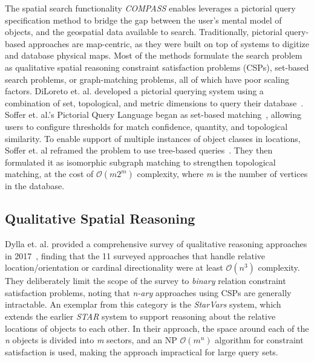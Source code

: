 \par{The spatial search functionality \emph{COMPASS} enables leverages a pictorial query specification method to bridge the gap between the user's mental model of objects, and the geospatial data available to search. 
Traditionally, pictorial query-based approaches are map-centric, as they were built on top of systems to digitize and database physical maps\cite{Samet1996,Samet1998}.
Most of the methods formulate the search problem as qualitative spatial reasoning constraint satisfaction problems (CSPs), set-based search problems, or graph-matching problems, all of which have poor scaling factors.
DiLoreto et. al. developed a pictorial querying system using a combination of set, topological, and metric dimensions to query their database~\cite{DiLoreto1996}.
Soffer et. al.'s Pictorial Query Language began as set-based matching~\cite{Soffer1997, Soffer1998a}, allowing users to configure thresholds for match confidence, quantity, and topological similarity.
To enable support of multiple instances of object classes in locations, Soffer et. al reframed the problem to use tree-based queries~\cite{Soffer1999}.
They then formulated it as isomorphic subgraph matching to strengthen topological matching, at the cost of $\mathcal{O}(m2^m)$ complexity, where \textit{m} is the number of vertices in the database. 



}


\subsection{Qualitative Spatial Reasoning}
\par{Dylla et. al. provided a comprehensive survey of qualitative reasoning approaches in 2017~\cite{Dylla2017}, finding that the 11 surveyed approaches that handle relative location/orientation or cardinal directionality were at least $\mathcal{O}(n^3)$ complexity. 
They deliberately limit the scope of the survey to \textit{binary} relation constraint satisfaction problems, noting that \textit{n-ary} approaches using CSPs are generally intractable.
An exemplar from this category is the \textit{StarVars} system, which extends the earlier \textit{STAR} system to support reasoning about the relative locations of objects to each other.
In their approach, the space around each of the \textit{n} objects is divided into \textit{m} sectors, and an NP $\mathcal{O}(m^n)$ algorithm for constraint satisfaction is used, making the approach impractical for large query sets.}
%

